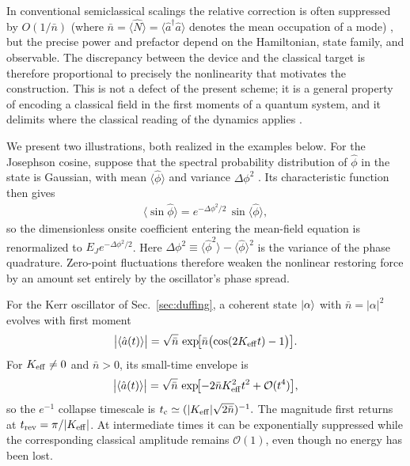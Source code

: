 \documentclass[pra,twocolumn,superscriptaddress,nofootinbib,floatfix]{revtex4-2}
\theoremstyle{remark}
\begin{document}
In conventional semiclassical scalings the relative correction is often suppressed by $O(1/\bar n)$ (where $\bar n = \langle \hat N \rangle =\langle\hat a^\dagger\hat a\rangle$ denotes the mean occupation of a mode) \cite{Polkovnikov_2010}, but the precise power and prefactor depend on the Hamiltonian, state family, and observable. The discrepancy between the device and the classical target is therefore proportional to precisely the nonlinearity that motivates the construction. This is not a defect of the present scheme; it is a general property of encoding a classical field in the first moments of a quantum system, and it delimits where the classical reading of the dynamics applies \cite{Ballentine_1994}.

We present two illustrations, both realized in the examples below.
For the Josephson cosine, suppose that the spectral probability distribution of \(\hat\phi\) in the state is Gaussian, with mean \(\langle\hat\phi\rangle\) and variance \(\Delta\phi^2\) \cite{Adesso_2014}. Its characteristic function then gives
\begin{align}
\bigl\langle \sin\hat\phi\bigr\rangle=e^{-\Delta\phi^2/2}\,\sin\bigl\langle\hat\phi\bigr\rangle,
\label{eq:debye-waller}
\end{align}
so the dimensionless onsite coefficient entering the mean-field equation is renormalized to $E_J e^{-\Delta\phi^2/2}$.
Here
\(\Delta\phi^2 \equiv \bigl\langle\hat\phi^2\bigr\rangle- \bigl\langle\hat\phi\bigr\rangle^2\)
is the variance of the phase quadrature. Zero-point fluctuations therefore weaken the nonlinear restoring force by an amount set entirely by the oscillator's phase spread.

For the Kerr oscillator of Sec.~\ref{sec:duffing},
a coherent state \(\ket{\alpha}\) with \(\bar n=|\alpha|^2\) evolves with first moment \cite{Milburn1986,YurkeStoler1986}
\[
\bigl|\langle\hat a(t)\rangle\bigr|  = \sqrt{\bar n}\, \exp\!\bigl[ \bar n\bigl(\cos(2K_{\rm eff}t)-1\bigr) \bigr].
\]
For \(K_{\rm eff}\neq0\) and \(\bar n>0\), its small-time envelope is
\[
\bigl|\langle\hat a(t)\rangle\bigr| = \sqrt{\bar n}\, \exp\!\bigl[ -2\bar n K_{\rm eff}^2t^2+\mathcal O(t^4)\bigr],
\]
so the \(e^{-1}\) collapse timescale is
\(t_{\rm c}\simeq (|K_{\rm eff}|\sqrt{2\bar n})^{-1}.\)
The magnitude first returns at \(t_{\rm rev}=\pi/|K_{\rm eff}|\). At intermediate times it can be exponentially suppressed while the corresponding classical amplitude remains \(\mathcal O(1)\), even though no energy has been lost.
\end{document}
